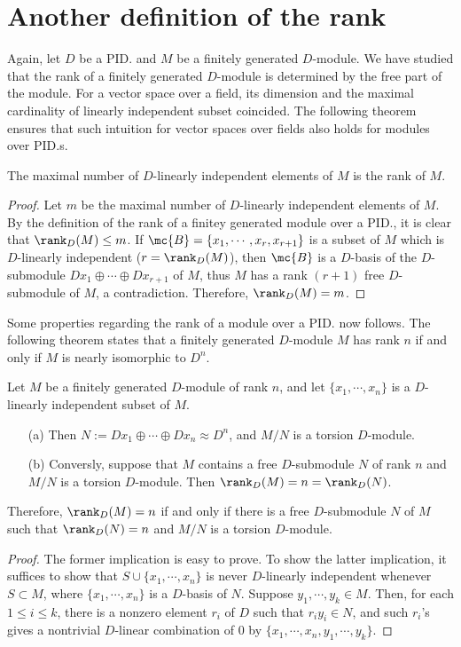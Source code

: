 \section{Another definition of the rank}

Again, let $D$ be a PID. and $M$ be a finitely generated $D$-module.
We have studied that the rank of a finitely generated $D$-module is determined by the free part of the module.
For a vector space over a field, its dimension and the maximal cardinality of linearly independent subset coincided.
The following theorem ensures that such intuition for vector spaces over fields also holds for modules over PID.s.
\begin{thm}
    The maximal number of $D$-linearly independent elements of $M$ is the rank of $M$.
\end{thm}
\begin{proof}
    Let $m$ be the maximal number of $D$-linearly independent elements of $M$.
    By the definition of the rank of a finitey generated module over a PID., it is clear that $\rank_D(M)\leq m$.
    If $\mc{B}=\{x_1, \cdots, x_r, x_{r+1}\}$ is a subset of $M$ which is $D$-linearly independent ($r=\rank_D(M)$), then $\mc{B}$ is a $D$-basis of the $D$-submodule $Dx_1\oplus\cdots\oplus Dx_{r+1}$ of $M$, thus $M$ has a rank $(r+1)$ free $D$-submodule of $M$, a contradiction.
    Therefore, $\rank_D(M)=m$.
\end{proof}

Some properties regarding the rank of a module over a PID. now follows.
The following theorem states that a finitely generated $D$-module $M$ has rank $n$ if and only if $M$ is nearly isomorphic to $D^n$.
\begin{thm}
    Let $M$ be a finitely generated $D$-module of rank $n$, and let $\{x_1, \cdots, x_n\}$ is a $D$-linearly independent subset of $M$.
    \begin{enumerate}
        \item[(a)]
        {
            Then $N:=Dx_1\oplus\cdots\oplus Dx_n\approx D^n$, and $M/N$ is a torsion $D$-module.
        }
        \item[(b)]
        {
            Conversly, suppose that $M$ contains a free $D$-submodule $N$ of rank $n$ and $M/N$ is a torsion $D$-module.
            Then $\rank_D(M)=n=\rank_D(N)$.
        }
    \end{enumerate}
    Therefore, $\rank_D(M)=n$ if and only if there is a free $D$-submodule $N$ of $M$ such that $\rank_D(N)=n$ and $M/N$ is a torsion $D$-module.
\end{thm}
\begin{proof}
    The former implication is easy to prove.
    To show the latter implication, it suffices to show that $S\cup\{x_1, \cdots, x_n\}$ is never $D$-linearly independent whenever $S\subset M$, where $\{x_1, \cdots, x_n\}$ is a $D$-basis of $N$.
    Suppose $y_1, \cdots, y_k\in M$.
    Then, for each $1\leq i\leq k$, there is a nonzero element $r_i$ of $D$ such that $r_i y_i\in N$, and such $r_i$'s gives a nontrivial $D$-linear combination of 0 by $\{x_1, \cdots, x_n, y_1, \cdots, y_k\}$.
\end{proof}

